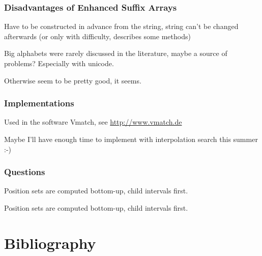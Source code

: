 \documentclass[compress,handout]{beamer} %
\begin{document}
\begin{frame}
	\frametitle{Disadvantages of Enhanced Suffix Arrays}
	Have to be constructed in advance from the string, string
	can't be changed afterwards (or only with difficulty,
	\cite{salson2010dynamic} describes some methods)

	Big alphabets were rarely discussed in the literature, maybe a
	source of problems? Especially with unicode.

	Otherwise seem to be pretty good, it seems.
\end{frame}

\begin{frame}
	\frametitle{Implementations}
	Used in the software Vmatch, see \href{http://www.vmatch.de}{http://www.vmatch.de}

	\vspace{1cm}

	Maybe I'll have enough time to implement with interpolation
	search this summer :-)
\end{frame}


\begin{frame}
	\frametitle{Questions}
	Position sets are computed bottom-up, child intervals first.

	Position sets are computed bottom-up, child intervals first.
	\Huge{\textinterrobang}
\end{frame}

\section{Bibliography}



\end{document}
